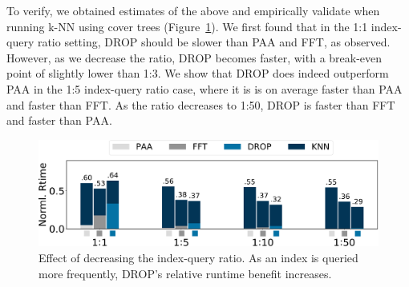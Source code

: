To verify, we obtained estimates of the above and empirically validate when running k-NN using cover trees (Figure~\ref{fig:query}).
We first found that in the 1:1 index-query ratio setting, DROP should be slower than PAA and FFT, as observed. 
However, as we decrease the ratio, DROP becomes faster, with a break-even point of slightly lower than 1:3. 
We show that DROP does indeed outperform PAA  in the 1:5 index-query ratio case, where it is is on average \red{$1.51\times$} faster than PAA and \red{$1.03\times$} faster than FFT. 
As the ratio decreases to 1:50, DROP is \red{$1.24\times$} faster than FFT and \red{$1.9\times$} faster than PAA.  


\begin{figure}
\includegraphics[width=\linewidth]{figs/query-rev.pdf}
\caption[]{Effect of decreasing the index-query ratio. As an index is queried more frequently, DROP's relative runtime benefit  increases.}
\label{fig:query}
\end{figure}

